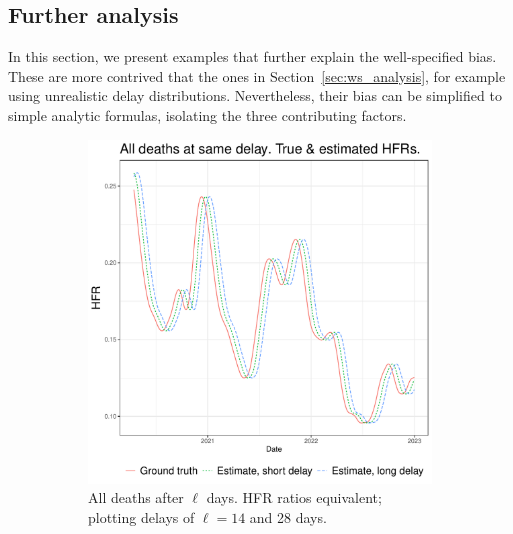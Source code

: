 \documentclass{article}
\begin{document}
\subsection{Further analysis}\label{apx:analysis}
In this section, we present examples that further explain the well-specified bias. These are more contrived that the ones in Section~\ref{sec:ws_analysis}, for example using unrealistic delay distributions. Nevertheless, their bias can be simplified to simple analytic formulas, isolating the three contributing factors.

\begin{figure}
     \centering
     \begin{subfigure}[b]{0.45\linewidth}
         \centering
         \includegraphics[width=\linewidth]{Figs/Simulated/sim_onehot.pdf}
         \caption{All deaths after $\ell$ days. HFR ratios equivalent; plotting delays of $\ell=14$ and 28 days.}
         \label{fig:onehot}
     \end{subfigure}
     \hfill
     \begin{subfigure}[b]{0.45\linewidth}
         \centering

\end{subfigure}
\end{figure}
\end{document}
